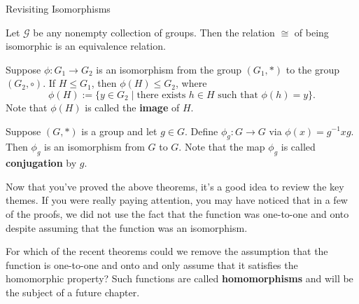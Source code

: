 \begin{section}{Revisiting Isomorphisms}
\begin{theorem}
Let $\mathcal{G}$ be any nonempty collection of groups.  Then the relation $\cong$ of being isomorphic is an equivalence relation.
\end{theorem}

\begin{theorem}
Suppose $\phi:G_1\to G_2$ is an isomorphism from the group $(G_1,*)$ to the group $(G_2,\circ)$.  If $H\leq G_1$, then $\phi(H)\leq G_2$, where
\[
\phi(H):=\{y\in G_2\mid \text{there exists } h\in H\text{ such that }\phi(h)=y\}. 
\]
Note that $\phi(H)$ is called the \textbf{image} of $H$.
\end{theorem}

\begin{theorem}
Suppose $(G,*)$ is a group and let $g\in G$.  Define $\phi_g:G\to G$ via $\phi(x)=g^{-1}xg$.  Then $\phi_g$ is an isomorphism from $G$ to $G$.  Note that the map $\phi_g$ is called \textbf{conjugation} by $g$.
\end{theorem}

Now that you've proved the above theorems, it's a good idea to review the key themes.  If you were really paying attention, you may have noticed that in a few of the proofs, we did not use the fact that the function was one-to-one and onto despite assuming that the function was an isomorphism.

\begin{problem}
For which of the recent theorems could we remove the assumption that the function is one-to-one and onto and only assume that it satisfies the homomorphic property?  Such functions are called \textbf{homomorphisms} and will be the subject of a future chapter.
\end{problem}


\end{section}